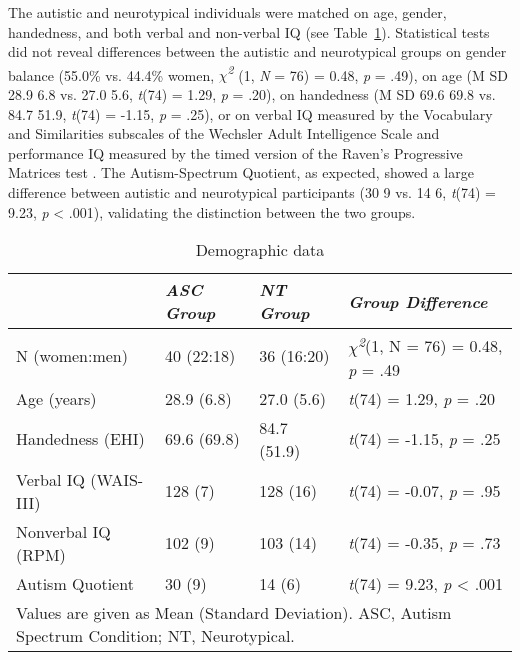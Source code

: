 The autistic and neurotypical individuals were matched on age, gender, handedness, and both verbal and non-verbal IQ (see Table~\ref{tab:ppt_stats}). Statistical tests did not reveal differences between the autistic and neurotypical groups on gender balance (55.0\% vs. 44.4\% women, \textit{$\chi$\textsuperscript{2}} (1, \textit{N} = 76) = 0.48, \textit{p} = .49), on age (M \textpm{} SD 28.9 \textpm{} 6.8 vs. 27.0 \textpm{} 5.6, \textit{t}(74) = 1.29, \textit{p} = .20), on handedness (M \textpm{} SD 69.6 \textpm{} 69.8 vs. 84.7 \textpm{} 51.9, \textit{t}(74) = -1.15, \textit{p} = .25), or on verbal IQ measured by the Vocabulary and Similarities subscales of the Wechsler Adult Intelligence Scale \citep[128 \textpm{} 7 vs. 128 \textpm{} 16, \textit{t}(74) = -0.07, \textit{p} = .95]{wechsler1997} and performance IQ measured by the timed version of the Raven's Progressive Matrices test \citep[102 \textpm{} 9 vs. 103 \textpm{} 14, \textit{t}(74) = -0.35, \textit{p} = .73]{raven1989}. The Autism-Spectrum Quotient, as expected, showed a large difference between autistic and neurotypical participants (30 \textpm{} 9 vs. 14 \textpm{} 6, \textit{t}(74) = 9.23, \textit{p} <  .001), validating the distinction between the two groups.

\begin{table}[ht]
    \captionsetup{justification=raggedright, singlelinecheck=false, font = normal} %
    \setlength{\tabcolsep}{12pt} %
    \renewcommand{\arraystretch}{1.5} %
    \caption{Demographic data}
    \label{tab:ppt_stats}
    \begin{tabular}{llll}
    \hline
    \textbf{} & \textit{ASC Group} & \textit{NT Group} & \textit{Group Difference} \\
    \hline
    N (women:men) & 40 (22:18) & 36 (16:20) & \textit{$\chi$\textsuperscript{2}}(1, N = 76) = 0.48, \textit{p} = .49 \\
    Age (years) & 28.9 (6.8) & 27.0 (5.6) & \textit{t}(74) = 1.29, \textit{p} = .20 \\
    Handedness (EHI) & 69.6 (69.8) & 84.7 (51.9) & \textit{t}(74) = -1.15, \textit{p} = .25 \\
    Verbal IQ (WAIS-III) & 128 (7) & 128 (16) & \textit{t}(74) = -0.07, \textit{p} = .95 \\
    Nonverbal IQ (RPM) & 102 (9) & 103 (14) & \textit{t}(74) = -0.35, \textit{p} = .73 \\
    Autism Quotient & 30 (9) & 14 (6) & \textit{t}(74) = 9.23, \textit{p} < .001 \\
    \hline
    \multicolumn{4}{l}{\small{Values are given as Mean (Standard Deviation). ASC, Autism Spectrum Condition; NT, Neurotypical.}} \\
    \end{tabular}
\end{table}

